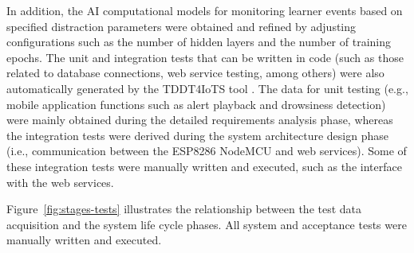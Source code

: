                In addition, the AI computational models for monitoring learner events based on specified distraction parameters were obtained and refined by adjusting configurations such as the number of hidden layers and the number of training epochs.
                The unit and integration tests that can be written in code (such as those related to database connections, web service testing, among others) were also automatically generated by the TDDT4IoTS tool \citep{Guerrero2024Test}. The data for unit testing (e.g., mobile application functions such as alert playback and drowsiness detection) were mainly obtained during the detailed requirements analysis phase, whereas the integration tests were derived during the system architecture design phase (i.e., communication between the ESP8286 NodeMCU and web services). Some of these integration tests were manually written and executed, such as the interface with the web services.
                
                Figure~\ref{fig:stages-tests} illustrates the relationship between the test data acquisition and the system life cycle phases. All system and acceptance tests were manually written and executed. 
                                
